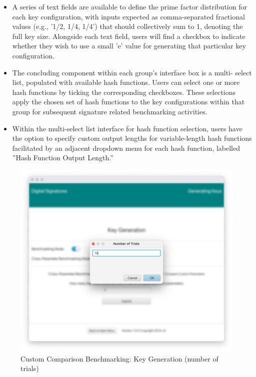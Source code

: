 \documentclass[]{final_report}
\begin{document}
\begin{itemize}
\item A series of text fields are available to define the prime factor distribution for each key configuration, with inputs expected as comma-separated fractional values (e.g., ’1/2, 1/4, 1/4’) that should collectively sum to 1, denoting the full key size.
Alongside each text field, users will find a checkbox to indicate whether they wish to use a small ’e’ value for generating that particular key configuration.
\item The concluding component within each group’s interface box is a multi- select list, populated with available hash functions. Users can select one or more hash functions by ticking the corresponding checkboxes. These selections apply the chosen set of hash functions to the key configurations within that group for subsequent signature related benchmarking activities.
\item Within the multi-select list interface for hash function selection, users  have the option to specify custom output lengths for variable-length hash functions facilitated by an adjacent dropdown menu for each hash function, labelled ”Hash Function Output Length.”
\end{itemize}


\begin{figure}[H]
    \centering
    \includegraphics[width=\textwidth]{main_pictures/ui/custom6.png}
    \caption{Custom Comparison Benchmarking: Key Generation (number of trials)}
\end{figure}
\end{document}
